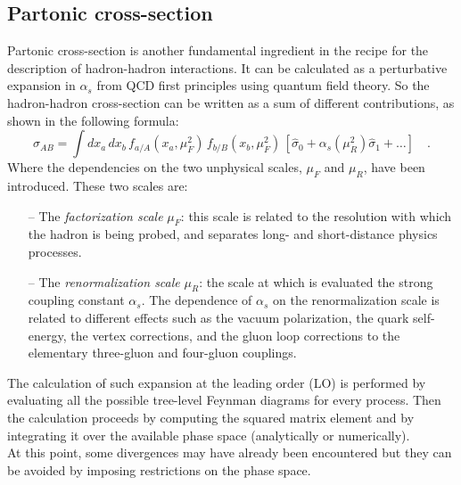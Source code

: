 %
%

\subsection{Partonic cross-section}

Partonic cross-section is another fundamental ingredient in the recipe for the description of hadron-hadron interactions. It can be calculated as a perturbative expansion in $\alpha_s$ from QCD first principles using quantum field theory. So the hadron-hadron cross-section can be written as a sum of different contributions, as shown in the following formula:
\begin{equation}
	\sigma_{AB}=\displaystyle\int dx_a\,dx_b\,f_{a/A}(x_a,\mu_F^2)\,f_{b/B}(x_b,\mu_F^2)\,\left[\hat{\sigma}_0+\alpha_s(\mu_R^2)\hat{\sigma}_1+\dots\right]\quad .
\label{eq:factorization3}
\end{equation}
Where the dependencies on the two unphysical scales, $\mu_F$ and $\mu_R$, have been introduced. These two  scales are:
\begin{itemize}
	\item[--] The \textit{factorization scale} $\mu_F$: this scale is related to the resolution with which the hadron is being probed, and separates long- and short-distance physics processes.
	\item[--] The \textit{renormalization scale} $\mu_R$: the scale at which is evaluated the strong coupling constant $\alpha_s$. The dependence of $\alpha_s$ on the renormalization scale is related to different effects such as the vacuum polarization, the quark self-energy, the vertex corrections, and the gluon loop corrections to the elementary three-gluon and four-gluon couplings.
\end{itemize}
The calculation of such expansion at the leading order (LO) is performed by evaluating all the possible tree-level Feynman diagrams for every process. Then the calculation proceeds by computing the squared matrix element and by integrating it over the available phase space (analytically or numerically).
\\
At this point, some divergences may have already been encountered but they can be avoided by imposing  restrictions on the phase space.

